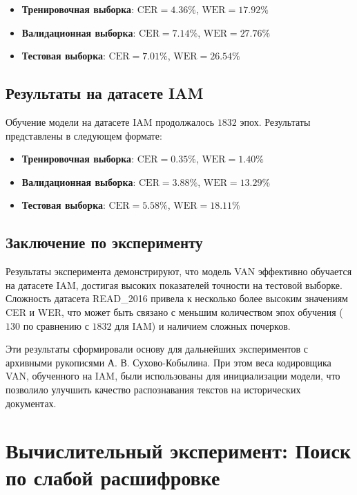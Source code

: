 \documentclass{article}
\begin{document}
\begin{itemize}
\item \textbf{Тренировочная выборка}: $\text{CER} = 4.36\%$, $\text{WER} = 17.92\%$
\item \textbf{Валидационная выборка}: $\text{CER} = 7.14\%$, $\text{WER} = 27.76\%$
\item \textbf{Тестовая выборка}: $\text{CER} = 7.01\%$, $\text{WER} = 26.54\%$
\end{itemize}

\subsection{Результаты на датасете IAM}

Обучение модели на датасете IAM продолжалось $1832$ эпох. Результаты представлены в следующем формате:

\begin{itemize}
\item \textbf{Тренировочная выборка}: $\text{CER} = 0.35\%$, $\text{WER} = 1.40\%$
\item \textbf{Валидационная выборка}: $\text{CER} = 3.88\%$, $\text{WER} = 13.29\%$
\item \textbf{Тестовая выборка}: $\text{CER} = 5.58\%$, $\text{WER} = 18.11\%$
\end{itemize}

\subsection{Заключение по эксперименту}

Результаты эксперимента демонстрируют, что модель VAN эффективно обучается на датасете IAM, достигая высоких показателей точности на тестовой выборке. Сложность датасета READ\_2016 привела к несколько более высоким значениям CER и WER, что может быть связано с меньшим количеством эпох обучения ($130$ по сравнению с $1832$ для IAM) и наличием сложных почерков.

Эти результаты сформировали основу для дальнейших экспериментов с архивными рукописями А. В. Сухово-Кобылина. При этом веса кодировщика VAN, обученного на IAM, были использованы для инициализации модели, что позволило улучшить качество распознавания текстов на исторических документах.



\section{Вычислительный эксперимент: Поиск по слабой расшифровке}
\end{document}

